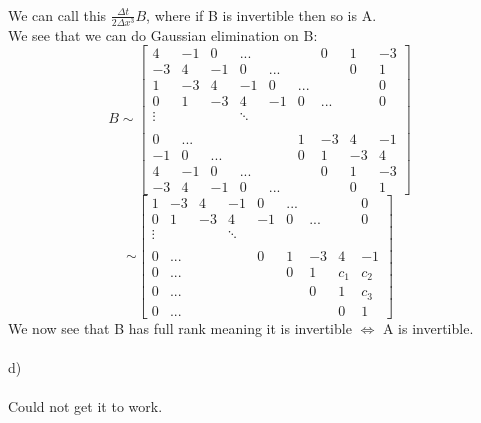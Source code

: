 \documentclass[12pt, letterpaper, twoside]{article}
\begin{document}
\newpage
\ \\
We can call this $\frac{\Delta t}{2\Delta x^3} B$, where if B is invertible then so is A.\\
We see that we can do Gaussian elimination on B:
$$
B \sim
\begin{bmatrix}
4 & -1 & 0 & ... &&&0& 1&-3\\
-3  & 4& -1 & 0   &...&&&0&1\\
1  & -3 & 4& -1 &0& ... &&&0\\
0  & 1 & -3& 4 &-1&0&...&&0\\
\vdots &&& \ddots\\
\\
0 & ... &&&&1&-3& 4 & -1\\
-1 & 0 &...&&& 0&1& -3 & 4\\
4 & -1 & 0 & ... &&&0& 1&-3\\
-3  & 4& -1 & 0   &...&&&0&1
\end{bmatrix}
$$
$$
\sim
\begin{bmatrix}
1  & -3 & 4& -1 &0& ... &&&0\\
0  & 1 & -3& 4 &-1&0&...&&0\\
\vdots &&& \ddots\\
\\
0 & ... &&&0& 1&-3& 4 & -1\\
0 & ... &&&& 0&1& c_1 & c_2\\
0 & ... &&&&&0& 1& c_3\\
0 & ... &&&&&&0&1
\end{bmatrix}
$$
We now see that B has full rank meaning it is invertible $\iff$ A is invertible.\\
\ \\
d)\\
\ \\
Could not get it to work. 
\end{document}

